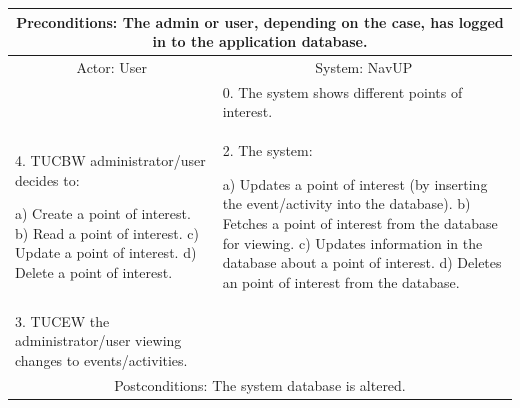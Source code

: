 ﻿\documentclass{article}
\begin{document}
       		 \begin{tabular}{|p{6cm}|p{6cm}|}
       		 \hline
       		 \multicolumn{2}{c}{\parbox{12cm}{\vspace{2mm}Preconditions: The admin or user, depending on the case, has logged in to the application database.\vspace{2mm}}} \\
       		 \hline
       		\multicolumn{1}{c}{Actor: User} & \multicolumn{1}{c}{ System: NavUP} \\
        		\hline
       		 & 0.	The system shows different points of interest.\\
       		 \hline
       		4.	TUCBW administrator/user decides to:

a)	Create a point of interest.
b)	Read a point of interest.
c)	Update a point of interest.
d)	Delete a point of interest.

 				&2.	The system:

a)	Updates a point of interest (by inserting the event/activity into the database).
b)	Fetches a point of interest from the database for viewing.
c)	Updates information in the database about a point of interest.
d)	Deletes an point of interest from the database.
\\
        		\hline
       		 	3.	TUCEW the administrator/user viewing changes to events/activities. &\\
       		 \hline
        		\multicolumn{2}{c}{Postconditions: The system database is altered.} \\
        		\hline
        \end{tabular} 
       
\end{document}
